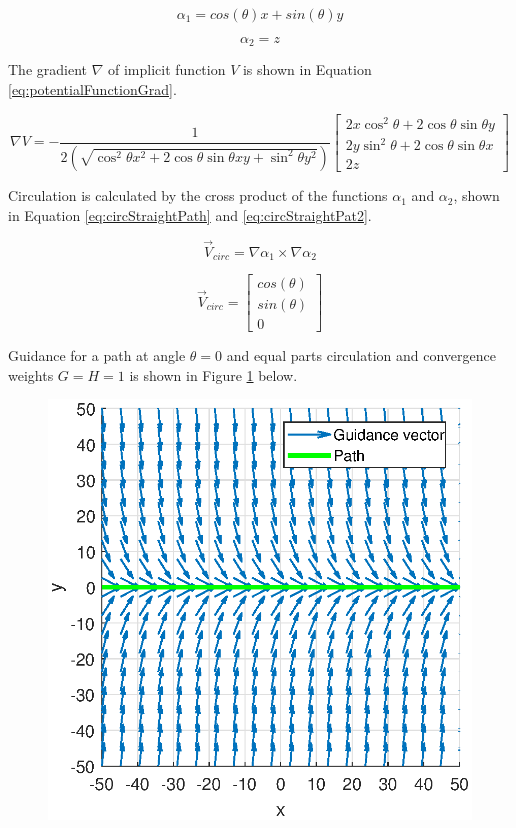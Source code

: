 \documentclass[conf]{new-aiaa}
\begin{document}
\begin{equation}
\label{eq:pathFunction}
\alpha_1 = cos(\theta)x + sin(\theta)y
\end{equation}

\begin{equation}
\label{eq:pathFunctionZ}
\alpha_2 = z
\end{equation}

The gradient $\nabla$ of implicit function $V$ is shown in Equation \ref{eq:potentialFunctionGrad}.

\begin{equation}
\label{eq:potentialFunctionGrad}
\nabla V = -\frac{1}{2(\sqrt{\cos^2\theta x^2+2\cos\theta\sin\theta xy +\sin^2 \theta y^2})} \begin{bmatrix}
2x\cos^2\theta + 2\cos\theta\sin\theta y \\
2y\sin^2\theta + 2\cos\theta\sin\theta x \\
2z
\end{bmatrix}
\end{equation}

Circulation is calculated by the cross product of the functions $\alpha_1$ and $\alpha_2$, shown in Equation \ref{eq:circStraightPath} and \ref{eq:circStraightPat2}.


\begin{equation}
\overrightarrow{V}_{circ} =  \nabla \alpha_1 \times \nabla \alpha_2 
\label{eq:circStraightPath}
\end{equation}


\begin{equation}
\label{eq:circStraightPat2}
\overrightarrow{V}_{circ} = \begin{bmatrix}
cos(\theta) \\
sin(\theta) \\
0
\end{bmatrix}
\end{equation}

Guidance for a path at angle $\theta = 0$ and equal parts circulation and convergence weights $G=H=1$ is shown in Figure \ref{fig:straightpath} below.

\begin{figure}[H]
	\centering
	\includegraphics[width=0.7\linewidth]{Figures/methods/straightPath}
	\caption{}
	\label{fig:straightpath}
\end{figure}
\end{document}
